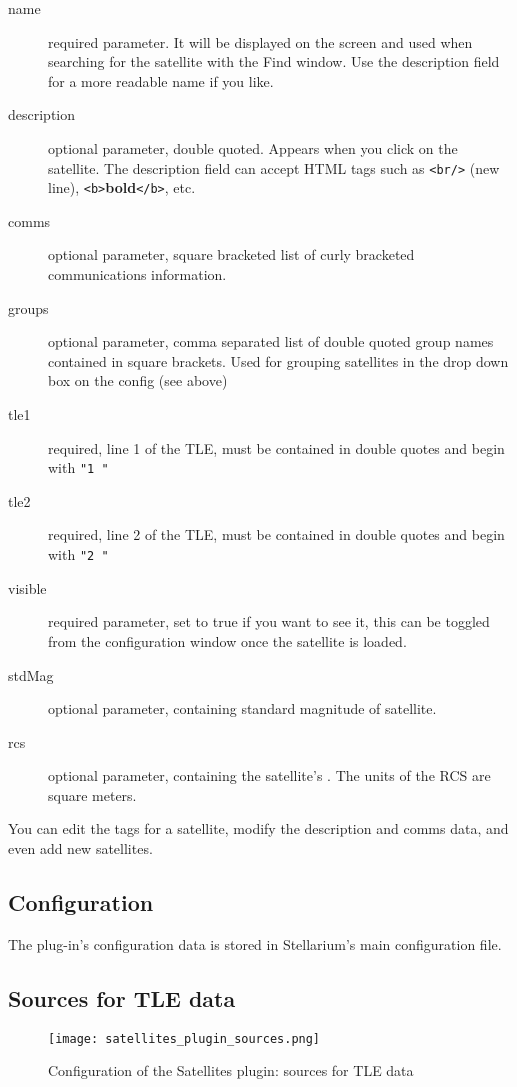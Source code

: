 \begin{description}
\item[name]  required parameter. It will be displayed on the screen and used
when searching for the satellite with the Find window. Use the
description field for a more readable name if you like.
\item[description]  optional parameter, double quoted. Appears when you click on the satellite.
  The description field can accept HTML tags such as \texttt{<br/>} (new line), \texttt{<b>}\textbf{bold}\texttt{</b>}, etc.
\item[comms]  optional parameter, square bracketed list of curly bracketed communications information.
\item[groups]  optional parameter, comma separated list of double quoted group names contained in square brackets.
  Used for grouping satellites in the drop down box on the config (see above)
\item[tle1]  required, line 1 of the TLE, must be contained in double quotes and begin with \texttt{"1~"}
\item[tle2]  required, line 2 of the TLE, must be contained in double quotes and begin with \texttt{"2~"}
\item[visible]  required parameter, set to true if you want to see it, this can be toggled from the configuration window once the satellite is loaded. 
\item[stdMag]  optional parameter, containing standard magnitude of satellite. 
\item[rcs] optional parameter, containing the satellite's  . The units of the RCS are square meters.
\end{description}
You can edit the tags for a satellite, modify the description and comms data, and even add new satellites. 

\subsection{Configuration}

The plug-in's configuration data is stored in Stellarium's main configuration file.

\subsection{Sources for TLE data}

\begin{figure}[tbp]
	\centering\texttt{[image: satellites\_plugin\_sources.png]}
	\caption{Configuration of the Satellites plugin: sources for TLE data}
	\label{fig:plugins:Satellites:Configuration:Sources}
\end{figure}

